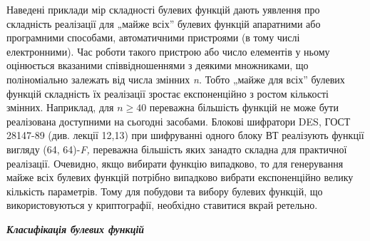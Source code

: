 Наведені приклади мір складності булевих функцій дають уявлення про складність
реалізації для „майже всіх” булевих функцій апаратними або програмними
способами, автоматичними пристроями (в тому числі електронними). Час роботи
такого пристрою або число елементів у ньому  оцінюється вказаними
співвідношеннями з деякими множниками, що поліноміально залежать від числа
змінних \textit{n}\textit{.} Тобто „майже для всіх” булевих функцій складність
їх реалізації зростає експоненційно з ростом кількості змінних. Наприклад, для 
${n\ge \text{40}}$ переважна більшість функцій не може бути реалізована
доступними на сьогодні засобами. Блокові шифратори DES, ГОСТ 28147-89 (див.
лекції 12,13) при шифруванні одного блоку ВТ реалізують функції вигляду (64,
64)-\textit{F}\textit{, }переважна більшість яких занадто складна для
практичної реалізації. Очевидно, якщо вибирати функцію випадково, то для
генерування майже всіх булевих функцій потрібно випадково вибрати експоненційно
велику кількість параметрів. Тому для побудови та вибору булевих функцій, що
використовуються у криптографії, необхідно ставитися вкрай ретельно.\textit{  }


\bigskip


\bigskip

{\centering\bfseries\itshape
Класифікація булевих функцій
\par}


\bigskip


\bigskip

